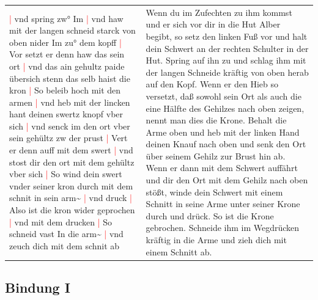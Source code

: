 \begin{longtable}{p{6.25cm}p{6.25cm}}
    \textcolor{red}{|} vnd spring zw° Im
    \textcolor{red}{|} vnd haw mit der langen schneid starck von oben nider Im zu° dem kopff
    \textcolor{red}{|} Vor setzt er denn haw das sein ort
    \textcolor{red}{|} vnd das ain gehultz paide übersich stenn das selb haist die kron
    \textcolor{red}{|} So beleib hoch mit den armen
    \textcolor{red}{|} vnd heb mit der lincken hant deinen swertz knopf vber sich
    \textcolor{red}{|} vnd senck im den ort vber sein gehültz zw der prust
    \textcolor{red}{|} Vert er denn auff mit dem swert
    \textcolor{red}{|} vnd stost dir den ort mit dem gehültz vber sich
    \textcolor{red}{|} So wind dein swert vnder seiner kron durch mit dem schnit in sein arm\textasciitilde{}
    \textcolor{red}{|} vnd druck
    \textcolor{red}{|} Also ist die kron wider geprochen
    \textcolor{red}{|} vnd mit dem drucken
    \textcolor{red}{|} So schneid vast In die arm\textasciitilde{}
    \textcolor{red}{|} vnd zeuch dich mit dem schnit ab
    &
    Wenn du im Zufechten zu ihm kommst und er sich vor dir in die Hut Alber begibt, so setz den linken Fuß vor und halt dein Schwert an der rechten Schulter in der Hut.
    Spring auf ihn zu und schlag ihm mit der langen Schneide kräftig von oben herab auf den Kopf.
    Wenn er den Hieb so versetzt, daß sowohl sein Ort als auch die eine Hälfte des Gehilzes nach oben zeigen, nennt man dies die Krone.
    Behalt die Arme oben und heb mit der linken Hand deinen Knauf nach oben und senk den Ort über seinem Gehilz zur Brust hin ab.
    Wenn er dann mit dem Schwert auffährt und dir den Ort mit dem Gehilz nach oben stößt, winde dein Schwert mit einem Schnitt in seine Arme unter seiner Krone durch und drück.
    So ist die Krone gebrochen.
    Schneide ihm im Wegdrücken kräftig in die Arme und zieh dich mit einem Schnitt ab.
\end{longtable}

\newpage

\begin{center}
\end{center}

\newpage

\subsection{Bindung I}
\label{sec:bindung1}

